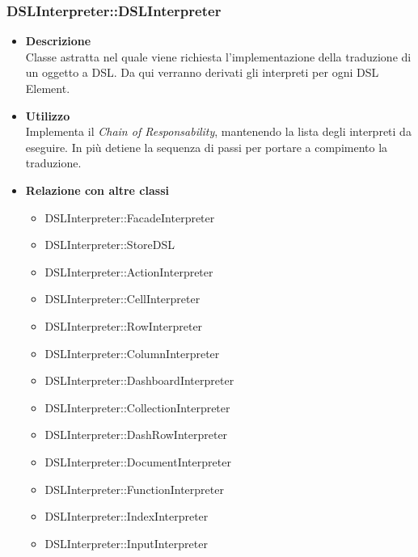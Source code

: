 \subsubsection{DSLInterpreter::DSLInterpreter}
\begin{itemize}
\item \textbf{Descrizione} \hfill \\
  Classe astratta nel quale viene richiesta l'implementazione della traduzione di un oggetto a DSL. Da qui verranno derivati gli interpreti per ogni DSL Element.
\item \textbf{Utilizzo} \hfill \\
  Implementa il \textit{Chain of Responsability}, mantenendo la lista degli interpreti da eseguire. In più detiene la sequenza di passi per portare a compimento la traduzione.
\item \textbf{Relazione con altre classi} \hfill
  \begin{itemize}
  \item DSLInterpreter::FacadeInterpreter
  \item DSLInterpreter::StoreDSL
  \item DSLInterpreter::ActionInterpreter
  \item DSLInterpreter::CellInterpreter
  \item DSLInterpreter::RowInterpreter
  \item DSLInterpreter::ColumnInterpreter
  \item DSLInterpreter::DashboardInterpreter
  \item DSLInterpreter::CollectionInterpreter
  \item DSLInterpreter::DashRowInterpreter
  \item DSLInterpreter::DocumentInterpreter
  \item DSLInterpreter::FunctionInterpreter
  \item DSLInterpreter::IndexInterpreter
  \item DSLInterpreter::InputInterpreter
  \end{itemize}
\end{itemize}

